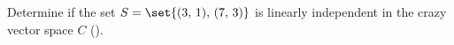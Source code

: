 Determine if the set $S=\set{(3,\,1),\,(7,\,3)}$ is linearly independent in the crazy vector space $C$ ().